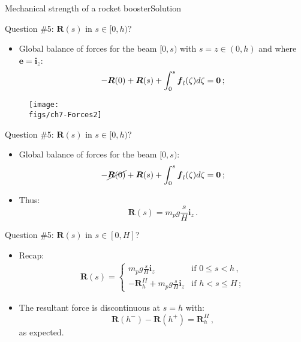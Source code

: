 \documentclass{beamer}
\newcommand{\id}{d}
\newcommand{\zj}{z}
\newcommand{\ej}{e}
\renewcommand{\ij}{i}
\newcommand{\ev}{{\boldsymbol\ej}}
\newcommand{\iv}{{\boldsymbol\ij}}
\newcommand{\fj}{f}
\newcommand{\Rj}{R}
\newcommand{\fv}{{\boldsymbol\fj}}
\newcommand{\Rv}{{\boldsymbol\Rj}}
\newcommand{\Fresj}{R}
\newcommand{\Fres}{{\boldsymbol\Fresj}}
\newcommand{\bzero}{{\bf 0}}
\begin{document}
\begin{frame}{Mechanical strength of a rocket booster}{Solution}
\begin{overprint}
\vskip-20pt
\begin{exampleblock}{Question \#5: $\Fres(s)$ in $s\in[0,h)$?}
\begin{itemize}
\item Global balance of forces for the beam $[0,s)$ with $s=\zj\in(0,h)$ and where $\ev=\iv_\zj$:
\begin{displaymath}
-\Fres(0)+\Fres(s)+\int_0^s\fv_l(\zeta)\id\zeta=\bzero\,;
\end{displaymath}
\end{itemize}
\end{exampleblock}
\begin{figure}
\centering\texttt{[image: \\figs/ch7-Forces2]}
\end{figure}

\vskip-20pt
\begin{exampleblock}{Question \#5: $\Fres(s)$ in $s\in[0,h)$?}
\begin{itemize}
\item Global balance of forces for the beam $[0,s)$:
\begin{displaymath}
-\cancel{\Fres(0)}+\Fres(s)+\int_0^s\fv_l(\zeta)\id\zeta=\bzero\,;
\end{displaymath}
\item Thus:
\begin{displaymath}
\Fres(s)=m_pg\frac{s}{H}\iv_\zj\,.
\end{displaymath}
\end{itemize}
\end{exampleblock}

\vskip-20pt
\begin{exampleblock}{Question \#5: $\Fres(s)$ in $s\in[0,H]$?}
\begin{itemize}
\item Recap:
\begin{displaymath}
\begin{split}
\Fres(s)=\left\{\begin{array}{ll}
\displaystyle m_pg\frac{s}{H}\iv_\zj & \text{if $0\leq s< h$}\,, \\
\displaystyle -\Rv_h^{II}+m_pg\frac{s}{H}\iv_\zj & \text{if $h< s\leq H$}\,;
\end{array}\right.
\end{split}
\end{displaymath}
\item The resultant force is discontinuous at $s=h$ with:
\begin{displaymath}
\Fres(h^-)-\Fres(h^+)=\Rv_h^{II}\,,
\end{displaymath}
as expected.
\end{itemize}
\end{exampleblock}

\end{overprint}

\end{frame}
\end{document}
